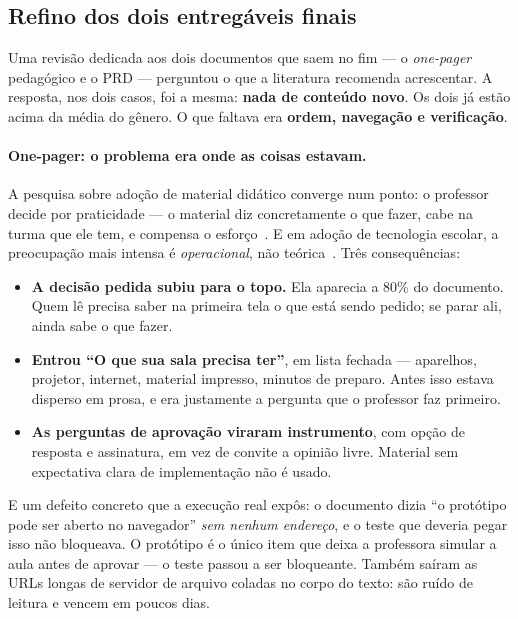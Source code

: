 \documentclass[11pt,a4paper]{article}
\begin{document}
\subsection{Refino dos dois entregáveis finais}

Uma revisão dedicada aos dois documentos que saem no fim --- o \emph{one-pager} pedagógico e o PRD
--- perguntou o que a literatura recomenda acrescentar. A resposta, nos dois casos, foi a mesma:
\textbf{nada de conteúdo novo}. Os dois já estão acima da média do gênero. O que faltava era
\textbf{ordem, navegação e verificação}.

\paragraph{One-pager: o problema era onde as coisas estavam.} A pesquisa sobre adoção de material
didático converge num ponto: o professor decide por praticidade --- o material diz concretamente o
que fazer, cabe na turma que ele tem, e compensa o esforço~\cite{doyle1977}. E em adoção de
tecnologia escolar, a preocupação mais intensa é \emph{operacional}, não teórica~\cite{cbam2015}.
Três consequências:

\begin{itemize}[leftmargin=*,itemsep=2pt]
  \item \textbf{A decisão pedida subiu para o topo.} Ela aparecia a 80\% do documento. Quem lê
  precisa saber na primeira tela o que está sendo pedido; se parar ali, ainda sabe o que fazer.
  \item \textbf{Entrou ``O que sua sala precisa ter''}, em lista fechada --- aparelhos, projetor,
  internet, material impresso, minutos de preparo. Antes isso estava disperso em prosa, e era
  justamente a pergunta que o professor faz primeiro.
  \item \textbf{As perguntas de aprovação viraram instrumento}, com opção de resposta e assinatura,
  em vez de convite a opinião livre. Material sem expectativa clara de implementação não é usado.
\end{itemize}

\noindent
E um defeito concreto que a execução real expôs: o documento dizia ``o protótipo pode ser aberto no
navegador'' \emph{sem nenhum endereço}, e o teste que deveria pegar isso não bloqueava. O protótipo é
o único item que deixa a professora simular a aula antes de aprovar --- o teste passou a ser
bloqueante. Também saíram as URLs longas de servidor de arquivo coladas no corpo do texto: são
ruído de leitura e vencem em poucos dias.
\end{document}
